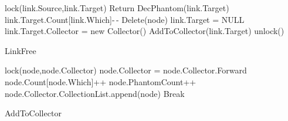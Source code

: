 \begin{algorithm}[H]
	\scriptsize

		\begin{algorithmic}[1]



\State lock(link.Source,link.Target)
\State Return
\EndIf
{}
\State DecPhantom(link.Target)
\Else
\State link.Target.Count[link.Which]-\,-
\State Delete(node)
\State link.Target = NULL
\Else
{}
\State link.Target.Collector = new Collector()
\EndIf
\State AddToCollector(link.Target)
\EndIf
\EndIf
\EndIf
\State unlock()

\EndProcedure

\caption{LinkFree}
\label{algorithm:linkfree}
\end{algorithmic}
\end{algorithm}


\setlength{\textfloatsep}{0pt}
\begin{algorithm}[H]
		\scriptsize
		
			\begin{algorithmic}[1]
				



{}
\State lock(node,node.Collector)
\State node.Collector = node.Collector.Forward
\Else
\State node.Count[node.Which]++
\State node.PhantomCount++
\State node.Collector.CollectionList.append(node)
\State Break
\EndIf
{}
\EndWhile
\EndProcedure
\caption{AddToCollector}
\label{single:algorithm:addtocollector}
\end{algorithmic}
\end{algorithm}


